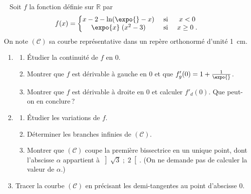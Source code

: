 \begin{exo} ~ \newline
\label{exo:el point anguleux}
Soit $f$ la fonction d\'efinie sur $\mathbb{R}$ par
\begin{displaymath}
f(x) =
\left\lbrace
\begin{matrix}
x - 2 - \ln ( \expo{} - x) & \text{ si } & x < 0     \\
\expo{x} \; (x^2 - 3)   & \text{ si } & x \geq 0  \; .
\end{matrix}
\right.
\end{displaymath}
On note $(\mathscr{C})$ sa courbe repr\'esentative dans un rep\`ere orthonorm\'e \Oij d'unit\'e 1~cm.
\begin{enumerate}
\item \begin{enumerate}
      \item \'Etudier la continuit\'e de $f$ en $0$.
      \item Montrer que $f$ est d\'erivable \`a gauche en $0$ et que $f'_g (0) = 1 + \frac{1}{\expo{}}$.
      \item Montrer que $f$ est d\'erivable \`a droite en $0$ et calculer $f'_d (0)$. Que peut-on en conclure\,?
      \end{enumerate}
\item \begin{enumerate}
      \item \'Etudier les variations de $f$.
      \item D\'eterminer les branches infinies de $(\mathscr{C})$.
      \item Montrer que $(\mathscr{C})$ coupe la premi\`ere bissectrice en un unique point, dont l'abscisse $\alpha$ appartient \`a $\left] \sqrt{3} \; ; \; 2 \right[$.
            (On ne demande pas de calculer la valeur de $\alpha$.)
      \end{enumerate}
\item Tracer la courbe $(\mathscr{C})$ en pr\'ecisant les demi-tangentes au point d'abscisse $0$.
\end{enumerate}
\end{exo}
